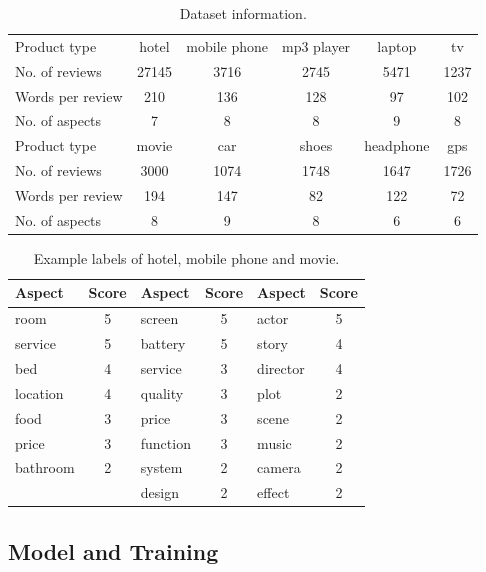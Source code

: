 \begin{table}
\centering
\begin{tabular}{|l|ccccc|}
\hline
Product type     & hotel & mobile phone & mp3 player & laptop    & tv   \\
No. of reviews   & 27145 & 3716         & 2745       & 5471      & 1237 \\
Words per review & 210   & 136          & 128        & 97        & 102  \\
No. of aspects   & 7     & 8            & 8          & 9         & 8    \\\hline\hline
Product type     & movie & car          & shoes      & headphone & gps  \\
No. of reviews   & 3000  & 1074         & 1748       & 1647      & 1726 \\
Words per review & 194   & 147          & 82         & 122       & 72   \\
No. of aspects   & 8     & 9            & 8          & 6         & 6   \\ \hline
\end{tabular}
\caption{Dataset information.}
\label{table:dataset}
\end{table}

\begin{table}
\centering
\begin{tabular}{|lc|lc|lc|}
\hline
Aspect   & Score & Aspect   & Score & Aspect   & Score \\\hline
room     & 5     & screen   & 5     & actor    & 5     \\
service  & 5     & battery  & 5     & story    & 4     \\
bed      & 4     & service  & 3     & director & 4     \\
location & 4     & quality  & 3     & plot     & 2     \\
food     & 3     & price    & 3     & scene    & 2     \\
price    & 3     & function & 3     & music    & 2     \\
bathroom & 2     & system   & 2     & camera   & 2     \\
         &       & design   & 2     & effect   & 2     \\ \hline
\end{tabular}
\caption{Example labels of hotel, mobile phone and movie.}
\label{table:data_example}
\end{table}

\subsection{Model and Training}

